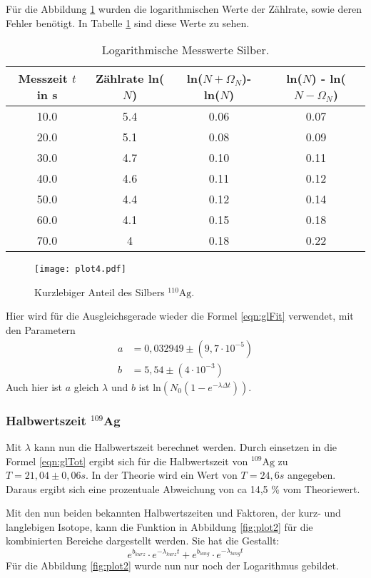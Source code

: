 Für die Abbildung \ref{fig:plot4} wurden die logarithmischen Werte der Zählrate, sowie deren Fehler benötigt.
In Tabelle \ref{tab:lnN2k} sind diese Werte zu sehen.

\begin{table}
  \centering
  \caption{Logarithmische Messwerte Silber.}
  \label{tab:lnN2k}
\begin{tabular}{c c c c}
  \toprule
  Messzeit $t$ in s & Zählrate ln($N$) & ln($N + \Omega_N$)- ln($N$) & ln($N$) - ln($N - \Omega_N$)\\
  \midrule
  10.0 & 5.4 & 0.06 & 0.07 \\
  20.0 & 5.1 & 0.08 & 0.09 \\
  30.0 & 4.7 & 0.10 & 0.11 \\
  40.0 & 4.6 & 0.11 & 0.12 \\
  50.0 & 4.4 & 0.12 & 0.14 \\
  60.0 & 4.1 & 0.15 & 0.18 \\
  70.0 & 4 & 0.18 & 0.22 \\
  \bottomrule
\end{tabular}
\end{table}
\FloatBarrier

\begin{figure}
  \centering
  \texttt{[image: plot4.pdf]}
  \caption{Kurzlebiger Anteil des Silbers $^{110}\text{Ag}$.}
  \label{fig:plot4}
\end{figure}
\FloatBarrier

Hier wird für die Ausgleichsgerade wieder die Formel \ref{eqn:glFit} verwendet, mit den Parametern 
\begin{align*}
  a &= 0,032949 \pm (9,7 \cdot 10^{-5}) \\
  b &= 5,54 \pm (4 \cdot 10^{-3})
\end{align*}
Auch hier ist $a$ gleich $\lambda$ und $b$ ist $\text{ln}(N_0(1-e^{-\lambda \Delta t}))$.

\subsubsection{Halbwertszeit $^{109}$Ag}

Mit $\lambda$ kann nun die Halbwertszeit berechnet werden.
Durch einsetzen in die Formel \ref{eqn:glTot} ergibt sich für die Halbwertszeit von $^{109}\text{Ag}$ zu $T = 21,04 \pm 0,06 s$.
In der Theorie wird ein Wert von $T = 24,6 s$ \cite{Periode} angegeben.
Daraus ergibt sich eine prozentuale Abweichung von ca 14,5 \% vom Theoriewert.

Mit den nun beiden bekannten Halbwertszeiten und Faktoren, der kurz- und langlebigen Isotope, kann die Funktion in Abbildung \ref{fig:plot2} für die kombinierten Bereiche dargestellt werden.
Sie hat die Gestallt:
\begin{equation}
  e^{b_{kurz}} \cdot e^{-\lambda_{kurz} t} + e^{b_{lang}} \cdot e^{-\lambda_{lang} t}
\end{equation}
Für die Abbildung \ref{fig:plot2} wurde nun nur noch der Logarithmus gebildet.